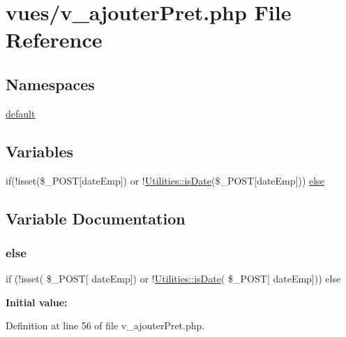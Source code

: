 \hypertarget{v__ajouter_pret_8php}{}\section{vues/v\+\_\+ajouter\+Pret.php File Reference}
\label{v__ajouter_pret_8php}
\subsection*{Namespaces}
\begin{DoxyCompactItemize}
\item 
 \hyperlink{namespacedefault}{default}
\end{DoxyCompactItemize}
\subsection*{Variables}
\begin{DoxyCompactItemize}
\item 
if(!isset(\$\+\_\+\+P\+O\+ST\mbox{[}\textquotesingle{}date\+Emp\textquotesingle{}\mbox{]}) or !\hyperlink{class_utilities_a4151d2b42a0b24dd9fdf6bc3823e6bda}{Utilities\+::is\+Date}(\$\+\_\+\+P\+O\+ST\mbox{[}\textquotesingle{}date\+Emp\textquotesingle{}\mbox{]})) \hyperlink{v__ajouter_pret_8php_a679d2a5fa51df221fbb54e10e6d6fdc5}{else}
\end{DoxyCompactItemize}


\subsection{Variable Documentation}
\mbox{\label{v__ajouter_pret_8php_a679d2a5fa51df221fbb54e10e6d6fdc5}} 
\subsubsection{\texorpdfstring{else}{else}}
{\footnotesize\ttfamily if (!isset( \$\+\_\+\+P\+O\+ST\mbox{[} \textquotesingle{}date\+Emp\textquotesingle{}\mbox{]}) or !\hyperlink{class_utilities_a4151d2b42a0b24dd9fdf6bc3823e6bda}{Utilities\+::is\+Date}( \$\+\_\+\+P\+O\+ST\mbox{[} \textquotesingle{}date\+Emp\textquotesingle{}\mbox{]})) else}

{\bfseries Initial value\+:}


Definition at line 56 of file v\+\_\+ajouter\+Pret.\+php.

